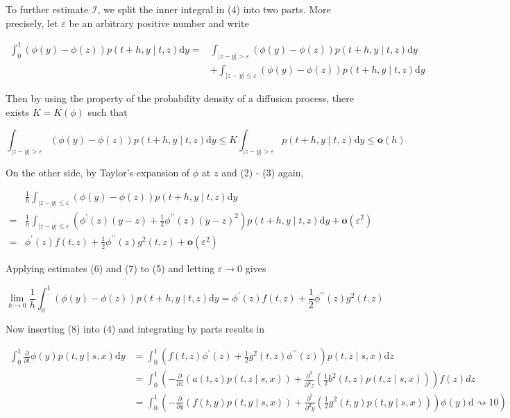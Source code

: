 \documentclass[10pt]{article}
\begin{document}
To further estimate $\mathscr{I}$, we split the inner integral in (4) into two parts. More precisely, let $\varepsilon$ be an arbitrary positive number and write


\begin{align*}
\int_{0}^{1}(\phi(y)-\phi(z)) p(t+h, y \mid t, z) \mathrm{d} y= & \int_{|z-y|>\varepsilon}(\phi(y)-\phi(z)) p(t+h, y \mid t, z) \mathrm{d} y \\
& +\int_{|z-y| \leq \varepsilon}(\phi(y)-\phi(z)) p(t+h, y \mid t, z) \mathrm{d} y \tag{5}
\end{align*}


Then by using the property of the probability density of a diffusion process, there exists $K=K(\phi)$ such that


\begin{equation*}
\int_{|z-y|>\varepsilon}(\phi(y)-\phi(z)) p(t+h, y \mid t, z) \mathrm{d} y \leq K \int_{|z-y|>\varepsilon} p(t+h, y \mid t, z) \mathrm{d} y \leq \mathbf{o}(h) \tag{6}
\end{equation*}


On the other side, by Taylor's expansion of $\phi$ at $z$ and (2) - (3) again,


\begin{align*}
& \frac{1}{h} \int_{|z-y| \leq \varepsilon}(\phi(y)-\phi(z)) p(t+h, y \mid t, z) \mathrm{d} y \\
= & \frac{1}{h} \int_{|z-y| \leq \varepsilon}\left(\phi^{\prime}(z)(y-z)+\frac{1}{2} \phi^{\prime \prime}(z)(y-z)^{2}\right) p(t+h, y \mid t, z) \mathrm{d} y+\mathbf{o}\left(\varepsilon^{2}\right) \\
= & \phi^{\prime}(z) f(t, z)+\frac{1}{2} \phi^{\prime \prime}(z) g^{2}(t, z)+\mathbf{o}\left(\varepsilon^{2}\right) \tag{7}
\end{align*}


Applying estimates (6) and (7) to (5) and letting $\varepsilon \rightarrow 0$ gives


\begin{equation*}
\lim _{h \rightarrow 0} \frac{1}{h} \int_{0}^{1}(\phi(y)-\phi(z)) p(t+h, y \mid t, z) \mathrm{d} y=\phi^{\prime}(z) f(t, z)+\frac{1}{2} \phi^{\prime \prime}(z) g^{2}(t, z) \tag{8}
\end{equation*}


Now inserting (8) into (4) and integrating by parts results in

$$
\begin{aligned}
\int_{0}^{1} \frac{\partial}{\partial t} \phi(y) p(t, y \mid s, x) \mathrm{d} y & =\int_{0}^{1}\left(f(t, z) \phi^{\prime}(z)+\frac{1}{2} g^{2}(t, z) \phi^{\prime \prime}(z)\right) p(t, z \mid s, x) \mathrm{d} z \\
& =\int_{0}^{1}\left(-\frac{\partial}{\partial z}(a(t, z) p(t, z \mid s, x))+\frac{\partial^{2}}{\partial^{2} z}\left(\frac{1}{2} b^{2}(t, z) p(t, z \mid s, x)\right)\right) f(z) d z \\
& \left.=\int_{0}^{1}\left(-\frac{\partial}{\partial y}(f(t, y) p(t, y \mid s, x))+\frac{\partial^{2}}{\partial^{2} y}\left(\frac{1}{2} g^{2}(t, y) p(t, y \mid s, x)\right)\right) \phi(y) \mathrm{d} \rightsquigarrow 10\right)
\end{aligned}
$$
\end{document}
